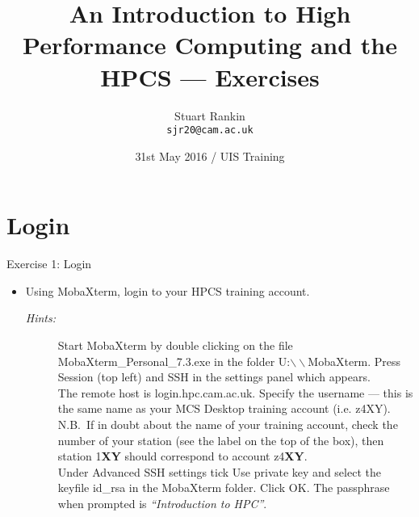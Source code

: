 \documentclass{beamer}
\title[HPC: An introduction --- Exercises] %
{An Introduction to High Performance Computing and the HPCS --- Exercises}
\author[SJ Rankin] %
{Stuart Rankin\\ \texttt{sjr20@cam.ac.uk}}
\institute[HPCS, University of Cambridge] %
{Research Computing Services (http://www.hpc.cam.ac.uk/)\\
University Information Services (http://www.uis.cam.ac.uk/)}
\date[31/05/2016] %
{31st May 2016 / UIS Training}
\begin{document}
\begin{frame}
  \titlepage
\end{frame}

\section{Login}
\begin{frame}{Exercise 1: Login}
\begin{itemize}
\item{Using MobaXterm, login to your HPCS training account.}
\begin{description}
\item[\emph{Hints:}]{\small Start MobaXterm by double clicking on the file \alert{MobaXterm\_Personal\_7.3.exe} in the folder U:$\backslash\backslash$MobaXterm. Press \alert{Session} (top left) and \alert{SSH} in the settings panel which appears.\\\smallskip
The remote host is \alert{login.hpc.cam.ac.uk}. Specify the username --- this is the same name as your MCS Desktop training account (i.e. \alert{z4XY}).\hfill\\\smallskip
{\scriptsize N.B.\ If in doubt about the name of your training account, check the number of your station (see the label on the top of the box), then station 1\textbf{XY} should correspond to account z4\textbf {XY}.}\hfill\\\smallskip
Under \alert{Advanced SSH settings} tick \alert{Use private key} and select the keyfile \alert{id\_rsa} in the MobaXterm folder. Click OK. The passphrase when prompted is \alert{\emph{``Introduction to HPC''}}.}
\end{description}
\end{itemize}
\end{frame}
\end{document}
